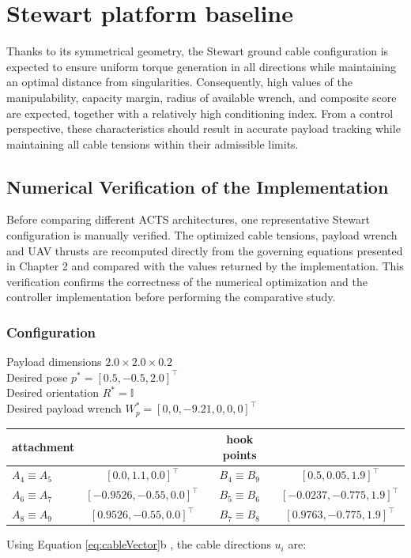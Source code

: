 

\section{Stewart platform baseline}
Thanks to its symmetrical geometry, the Stewart ground cable configuration is expected to ensure uniform torque generation in all directions while maintaining an optimal distance from singularities.
Consequently, high values of the manipulability, capacity margin, radius of available wrench, and composite score are expected, together with a relatively high conditioning index. From a control perspective, these characteristics should result in accurate payload tracking while maintaining all cable tensions within their admissible limits.

\subsection{Numerical Verification of the Implementation}
Before comparing different ACTS architectures, one representative Stewart configuration is manually verified. The optimized cable tensions, payload wrench and UAV thrusts are recomputed directly from the governing equations presented in Chapter 2 and compared with the values returned by the implementation. This verification confirms the correctness of the numerical optimization and the controller implementation before performing the comparative study.

\subsubsection{Configuration}
Payload dimensions $2.0 \times 2.0 \times 0.2$ \\
Desired pose $p^*= [0.5, -0.5, 2.0]^\top $ \\
Desired orientation $R^* = \mathbb{I}$ \\
Desired payload wrench $W_p^* = [0, 0, -9.21, 0, 0, 0]^\top$

\begin{table}[h]
    \centering
\begin{tabular}{lccc}
    attachment        &    & hook points & \\ \hline
$A_4 \equiv A_5$ &  $[0.0, 1.1, 0.0]^\top $         &   $B_4 \equiv B_9$ &  $[0.5, 0.05, 1.9]^\top $          \\
$A_6 \equiv A_7$ &  $[-0.9526, -0.55, 0.0]^\top $   &   $B_5 \equiv B_6$ &  $[-0.0237, -0.775, 1.9]^\top $    \\
$A_8 \equiv A_9$ &  $[0.9526, -0.55, 0.0]^\top $    &   $B_7 \equiv B_8$ &  $[0.9763, -0.775, 1.9]^\top $     \\ 

\end{tabular}
\end{table}
\noindent Using Equation \ref{eq:cableVector}b , the cable directions $u_i$ are: 

